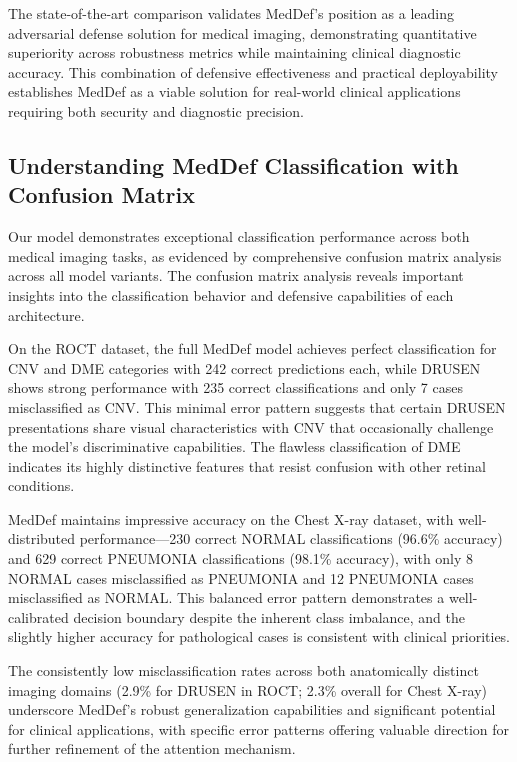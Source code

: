\documentclass[preprint,12pt]{elsarticle}
\begin{document}
The state-of-the-art comparison validates MedDef's position as a leading adversarial defense solution for medical imaging, demonstrating quantitative superiority across robustness metrics while maintaining clinical diagnostic accuracy. This combination of defensive effectiveness and practical deployability establishes MedDef as a viable solution for real-world clinical applications requiring both security and diagnostic precision.

\subsection{Understanding MedDef Classification with Confusion Matrix}
Our model demonstrates exceptional classification performance across both medical imaging tasks, as evidenced by comprehensive confusion matrix analysis across all model variants. The confusion matrix analysis reveals important insights into the classification behavior and defensive capabilities of each architecture.

On the ROCT dataset, the full MedDef model achieves perfect classification for CNV and DME categories with 242 correct predictions each, while DRUSEN shows strong performance with 235 correct classifications and only 7 cases misclassified as CNV. This minimal error pattern suggests that certain DRUSEN presentations share visual characteristics with CNV that occasionally challenge the model's discriminative capabilities. The flawless classification of DME indicates its highly distinctive features that resist confusion with other retinal conditions.

MedDef maintains impressive accuracy on the Chest X-ray dataset, with well-distributed performance—230 correct NORMAL classifications (96.6\% accuracy) and 629 correct PNEUMONIA classifications (98.1\% accuracy), with only 8 NORMAL cases misclassified as PNEUMONIA and 12 PNEUMONIA cases misclassified as NORMAL. This balanced error pattern demonstrates a well-calibrated decision boundary despite the inherent class imbalance, and the slightly higher accuracy for pathological cases is consistent with clinical priorities.

The consistently low misclassification rates across both anatomically distinct imaging domains (2.9\% for DRUSEN in ROCT; 2.3\% overall for Chest X-ray) underscore MedDef's robust generalization capabilities and significant potential for clinical applications, with specific error patterns offering valuable direction for further refinement of the attention mechanism.
\end{document}
